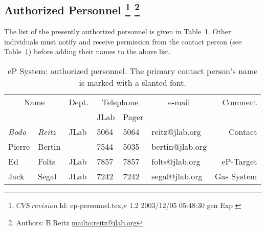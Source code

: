 \begin{safetyen}{0}{0}
\section[Authorized  Personnel]{Authorized  Personnel
\footnote{
   $CVS~revision~ $Id: ep-personnel.tex,v 1.2 2003/12/05 05:48:30 gen Exp $ $
 }
\footnote{Authors: B.Reitz \url{mailto:reitz@jlab.org}}
}
\end{safetyen}
The list
of the presently authorized personnel is given in Table~\ref{tab:ep:personnel}.
Other individuals must notify and receive permission from
the contact person (see Table~\ref{tab:ep:personnel}) before adding their names 
to the above list.
\begin{table}[ht]
\begin{center}
\begin{tabular}{|ll|l|l|l|l|r|} \hline
  \multicolumn{2}{|c|}{Name} & Dept. & \multicolumn{2}{c|}{Telephone} & 
  \multicolumn{1}{c|}{e-mail} & Comment \\ 
  \cline{4-5}
   &  &   & JLab & Pager &  & \\ 
\hline
 {\em Bodo} & {\em Reitz}  & JLab    & 5064 & 5064 & reitz@jlab.org      & Contact     \\ 
 Pierre     & Bertin       &         & 7544 & 5035 & bertin@jlab.org &  \\ 
 Ed         & Folts        & JLab    & 7857 & 7857 & folts@jlab.org  &  eP-Target \\ 
 Jack       & Segal        & JLab    & 7242 & 7242 & segal@jlab.org  &  Gas System \\ 
\hline
\end{tabular}
\end{center}
\caption[eP System: authorized personnel]{
   eP System: authorized personnel. The primary contact person's
   name is marked with a slanted font. 
}
\label{tab:ep:personnel}
\end{table}

%
%
%
